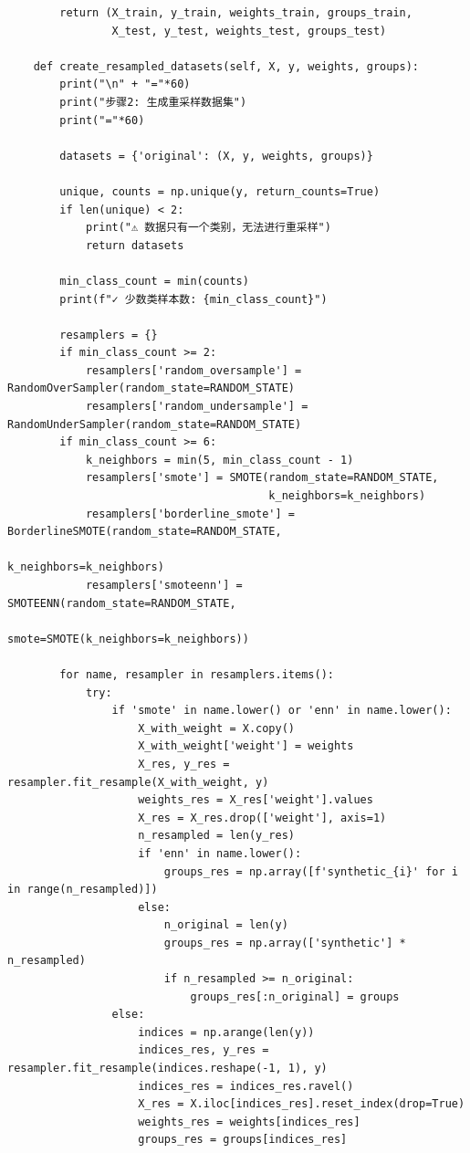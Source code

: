 \begin{lstlisting}
        return (X_train, y_train, weights_train, groups_train,
                X_test, y_test, weights_test, groups_test)

    def create_resampled_datasets(self, X, y, weights, groups):
        print("\n" + "="*60)
        print("步骤2: 生成重采样数据集")
        print("="*60)

        datasets = {'original': (X, y, weights, groups)}

        unique, counts = np.unique(y, return_counts=True)
        if len(unique) < 2:
            print("⚠️ 数据只有一个类别，无法进行重采样")
            return datasets

        min_class_count = min(counts)
        print(f"✓ 少数类样本数: {min_class_count}")

        resamplers = {}
        if min_class_count >= 2:
            resamplers['random_oversample'] = RandomOverSampler(random_state=RANDOM_STATE)
            resamplers['random_undersample'] = RandomUnderSampler(random_state=RANDOM_STATE)
        if min_class_count >= 6:
            k_neighbors = min(5, min_class_count - 1)
            resamplers['smote'] = SMOTE(random_state=RANDOM_STATE, 
                                        k_neighbors=k_neighbors)
            resamplers['borderline_smote'] = BorderlineSMOTE(random_state=RANDOM_STATE, 
                                                             k_neighbors=k_neighbors)
            resamplers['smoteenn'] = SMOTEENN(random_state=RANDOM_STATE, 
                                              smote=SMOTE(k_neighbors=k_neighbors))

        for name, resampler in resamplers.items():
            try:
                if 'smote' in name.lower() or 'enn' in name.lower():
                    X_with_weight = X.copy()
                    X_with_weight['weight'] = weights
                    X_res, y_res = resampler.fit_resample(X_with_weight, y)
                    weights_res = X_res['weight'].values
                    X_res = X_res.drop(['weight'], axis=1)
                    n_resampled = len(y_res)
                    if 'enn' in name.lower():
                        groups_res = np.array([f'synthetic_{i}' for i in range(n_resampled)])
                    else:
                        n_original = len(y)
                        groups_res = np.array(['synthetic'] * n_resampled)
                        if n_resampled >= n_original:
                            groups_res[:n_original] = groups
                else:
                    indices = np.arange(len(y))
                    indices_res, y_res = resampler.fit_resample(indices.reshape(-1, 1), y)
                    indices_res = indices_res.ravel()
                    X_res = X.iloc[indices_res].reset_index(drop=True)
                    weights_res = weights[indices_res]
                    groups_res = groups[indices_res]


\end{lstlisting}
